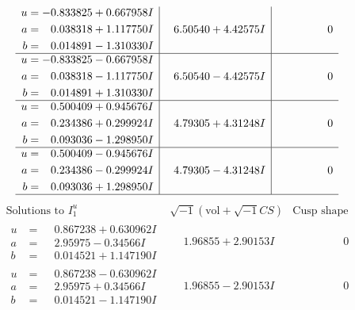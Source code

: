 \documentclass[1p]{elsarticle_modified}
\theoremstyle{definition}
\newcommand{\I}{\sqrt{-1}}
\begin{document}
$$\begin{array}{c|c|c}
\begin{aligned}
u &= -0.833825 + 0.667958 I \\
a &= \phantom{-}0.038318 + 1.117750 I \\
b &= \phantom{-}0.014891 - 1.310330 I\end{aligned}
 & \phantom{-}6.50540 + 4.42575 I & \phantom{-0.000000 } 0 \\ \hline\begin{aligned}
u &= -0.833825 - 0.667958 I \\
a &= \phantom{-}0.038318 - 1.117750 I \\
b &= \phantom{-}0.014891 + 1.310330 I\end{aligned}
 & \phantom{-}6.50540 - 4.42575 I & \phantom{-0.000000 } 0 \\ \hline\begin{aligned}
u &= \phantom{-}0.500409 + 0.945676 I \\
a &= \phantom{-}0.234386 + 0.299924 I \\
b &= \phantom{-}0.093036 - 1.298950 I\end{aligned}
 & \phantom{-}4.79305 + 4.31248 I & \phantom{-0.000000 } 0 \\ \hline\begin{aligned}
u &= \phantom{-}0.500409 - 0.945676 I \\
a &= \phantom{-}0.234386 - 0.299924 I \\
b &= \phantom{-}0.093036 + 1.298950 I\end{aligned}
 & \phantom{-}4.79305 - 4.31248 I & \phantom{-0.000000 } 0\\
 \hline 
 \end{array}$$\newpage$$\begin{array}{c|c|c}  
\text{Solutions to }I^u_{1}& \I (\text{vol} + \sqrt{-1}CS) & \text{Cusp shape}\\
 \hline 
\begin{aligned}
u &= \phantom{-}0.867238 + 0.630962 I \\
a &= \phantom{-}2.95975 - 0.34566 I \\
b &= \phantom{-}0.014521 + 1.147190 I\end{aligned}
 & \phantom{-}1.96855 + 2.90153 I & \phantom{-0.000000 } 0 \\ \hline\begin{aligned}
u &= \phantom{-}0.867238 - 0.630962 I \\
a &= \phantom{-}2.95975 + 0.34566 I \\
b &= \phantom{-}0.014521 - 1.147190 I\end{aligned}
 & \phantom{-}1.96855 - 2.90153 I & \phantom{-0.000000 } 0 \\ \hline\begin{aligned}

\end{aligned}
\end{array}$$
\end{document}
